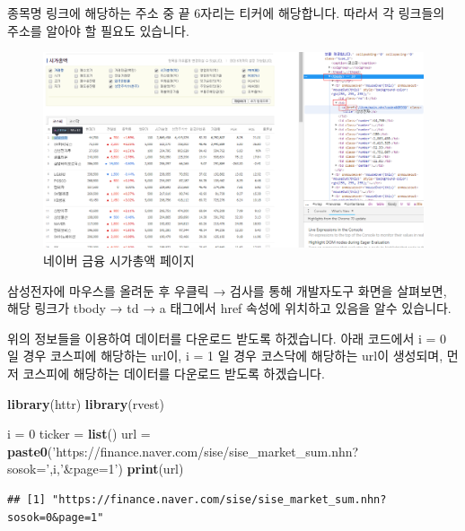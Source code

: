 \documentclass[]{book}
\newenvironment{Shaded}{\begin{snugshade}}{\end{snugshade}}
\newcommand{\DecValTok}[1]{\textcolor[rgb]{0.00,0.00,0.81}{#1}}
\newcommand{\KeywordTok}[1]{\textcolor[rgb]{0.13,0.29,0.53}{\textbf{#1}}}
\newcommand{\NormalTok}[1]{#1}
\newcommand{\StringTok}[1]{\textcolor[rgb]{0.31,0.60,0.02}{#1}}
\begin{document}
종목명 링크에 해당하는 주소 중 끝 6자리는 티커에 해당합니다. 따라서 각 링크들의 주소를 알아야 할 필요도 있습니다.

\begin{figure}

{\centering \includegraphics[width=1\linewidth]{images/crawl_naver_corp} 

}

\caption{네이버 금융 시가총액 페이지}\label{fig:unnamed-chunk-18}
\end{figure}

삼성전자에 마우스를 올려둔 후 우클릭 → 검사를 통해 개발자도구 화면을 살펴보면, 해당 링크가 tbody → td → a 태그에서 href 속성에 위치하고 있음을 알수 있습니다.

위의 정보들을 이용하여 데이터를 다운로드 받도록 하겠습니다. 아래 코드에서 i = 0 일 경우 코스피에 해당하는 url이, i = 1 일 경우 코스닥에 해당하는 url이 생성되며, 먼저 코스피에 해당하는 데이터를 다운로드 받도록 하겠습니다.

\begin{Shaded}
\begin{Highlighting}[]
\KeywordTok{library}\NormalTok{(httr)}
\KeywordTok{library}\NormalTok{(rvest)}

\NormalTok{i =}\StringTok{ }\DecValTok{0}
\NormalTok{ticker =}\StringTok{ }\KeywordTok{list}\NormalTok{()}
\NormalTok{url =}\StringTok{ }\KeywordTok{paste0}\NormalTok{(}\StringTok{'https://finance.naver.com/sise/sise_market_sum.nhn?sosok='}\NormalTok{,i,}\StringTok{'&page=1'}\NormalTok{)}
\KeywordTok{print}\NormalTok{(url)}
\end{Highlighting}
\end{Shaded}

\begin{verbatim}
## [1] "https://finance.naver.com/sise/sise_market_sum.nhn?sosok=0&page=1"
\end{verbatim}
\end{document}
